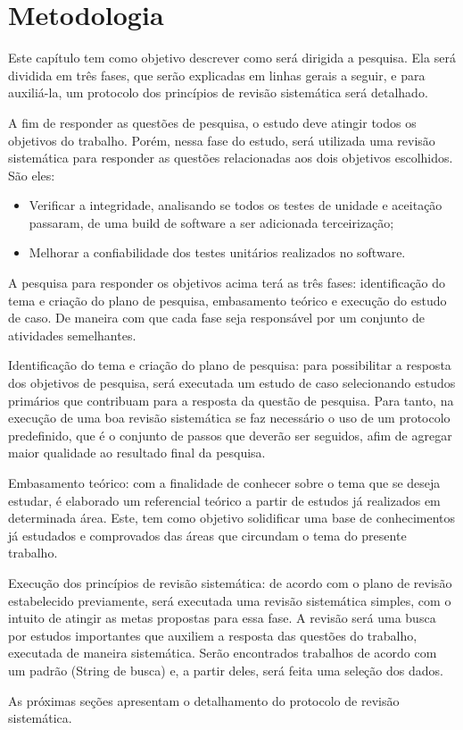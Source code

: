 \chapter[Metodologia]{Metodologia}

Este capítulo tem como objetivo descrever como será dirigida a pesquisa.
Ela será dividida em três fases, que serão explicadas em linhas gerais a seguir,
e para auxiliá-la, um protocolo dos princípios de revisão sistemática será detalhado.

A fim de responder as questões de pesquisa, o estudo deve atingir todos
os objetivos do trabalho. Porém, nessa fase do estudo, será utilizada uma revisão
sistemática para responder as questões relacionadas aos dois objetivos
escolhidos. São eles:

\begin{itemize}
\item Verificar a integridade, analisando se todos os testes de unidade e aceitação
passaram, de uma build de software a ser adicionada terceirização;

\item Melhorar a confiabilidade dos testes unitários realizados no software.
\end{itemize}

A pesquisa para responder os objetivos acima terá as três fases:
identificação do tema e criação do plano de pesquisa, embasamento teórico e
execução do estudo de caso. De maneira com que cada fase seja
responsável por um conjunto de atividades semelhantes.

Identificação do tema e criação do plano de pesquisa: para possibilitar a
resposta dos objetivos de pesquisa, será executada um estudo de caso
selecionando estudos primários que contribuam para a resposta da questão de
pesquisa. Para tanto, na execução de uma boa revisão sistemática se faz
necessário o uso de um protocolo predefinido, que é o conjunto de passos que
deverão ser seguidos, afim de agregar maior qualidade ao resultado final da
pesquisa.

Embasamento teórico: com a finalidade de conhecer sobre o tema que se
deseja estudar, é elaborado um referencial teórico a partir de estudos já
realizados em determinada área. Este, tem como objetivo solidificar uma base de
conhecimentos já estudados e comprovados das áreas que circundam o tema do
presente trabalho.

Execução dos princípios de revisão sistemática: de acordo com o plano de revisão
estabelecido previamente, será executada uma revisão sistemática simples,
com o intuito
de atingir as metas propostas para essa fase. A revisão será uma busca por
estudos importantes que auxiliem a resposta das questões do trabalho, executada
de maneira sistemática. Serão encontrados trabalhos de acordo com um padrão
(String de busca) e, a partir deles, será feita uma seleção dos dados.

As próximas seções apresentam o detalhamento do protocolo de revisão
sistemática.

